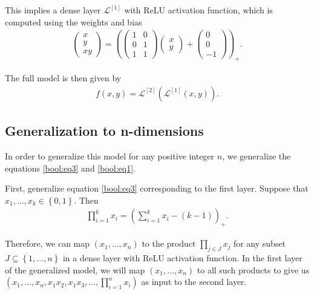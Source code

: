 \documentclass{somasmsc}
\begin{document}
This implies a dense layer $\mathcal{L}^{\left[1\right]}$ with ReLU activation function, which is computed using the weights and bias
\begin{align} \label{bool:eq4}
\begin{pmatrix}
    x \\
    y \\
    xy
\end{pmatrix}
=
\left(
\begin{pmatrix}
    1 & 0 \\
    0 & 1 \\
    1 & 1
\end{pmatrix}
\begin{pmatrix}
    x \\
    y
\end{pmatrix}
+
\begin{pmatrix}
    0 \\
    0 \\
    -1
\end{pmatrix}
\right)_+.
\end{align}

The full model is then given by
\begin{align*}
f\left(x, y\right) = \mathcal{L}^{\left[2\right]}\left(\mathcal{L}^{\left[1\right]}\left(x, y\right)\right).
\end{align*}

\subsection{Generalization to n-dimensions}\label{bool:gen}

In order to generalize this model for any positive integer $n$, we generalize the equations \ref{bool:eq3} and \ref{bool:eq1}.

First, generalize equation \ref{bool:eq3} corresponding to the first layer. Suppose that $x_1, ..., x_k \in \left\{0, 1\right\}$. Then
\begin{align}\label{bool:eq5}
\prod_{i=1}^{k} x_i = \left(\sum_{i=1}^{k} x_i - \left(k - 1\right)\right)_+.
\end{align}

Therefore, we can map $\left(x_1, \dots, x_n\right)$ to the product $\prod_{j \in J} x_j$ for any subset $J \subseteq \left\{1, \dots, n\right\}$ in a dense layer with ReLU activation function. In the first layer of the generalized model, we will map $\left(x_1, \dots, x_n\right)$ to all such products to give us $\left(x_1, \dots, x_n, x_1x_2, x_1x_3, \dots, \prod_{i=1}^n x_i\right)$ as input to the second layer.
\end{document}
